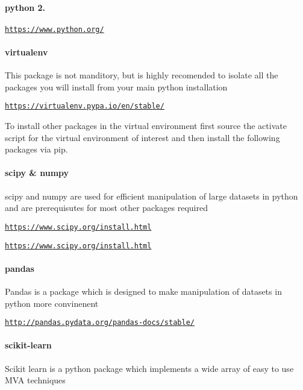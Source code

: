 \paragraph*{python 2.}

\href{https://www.python.org/}{\tt https\-://www.\-python.\-org/}

\paragraph*{virtualenv}

This package is not manditory, but is highly recomended to isolate all the packages you will install from your main python installation

\href{https://virtualenv.pypa.io/en/stable/}{\tt https\-://virtualenv.\-pypa.\-io/en/stable/}

To install other packages in the virtual environment first source the activate script for the virtual environment of interest and then install the following packages via pip.

\paragraph*{scipy \& numpy}

scipy and numpy are used for efficient manipulation of large datasets in python and are prerequisutes for most other packages required

\href{https://www.scipy.org/install.html}{\tt https\-://www.\-scipy.\-org/install.\-html}

\href{https://www.scipy.org/install.html}{\tt https\-://www.\-scipy.\-org/install.\-html}

\paragraph*{pandas}

Pandas is a package which is designed to make manipulation of datasets in python more convinenent

\href{http://pandas.pydata.org/pandas-docs/stable/}{\tt http\-://pandas.\-pydata.\-org/pandas-\/docs/stable/}

\paragraph*{scikit-\/learn}

Scikit learn is a python package which implements a wide array of easy to use M\-V\-A techniques

